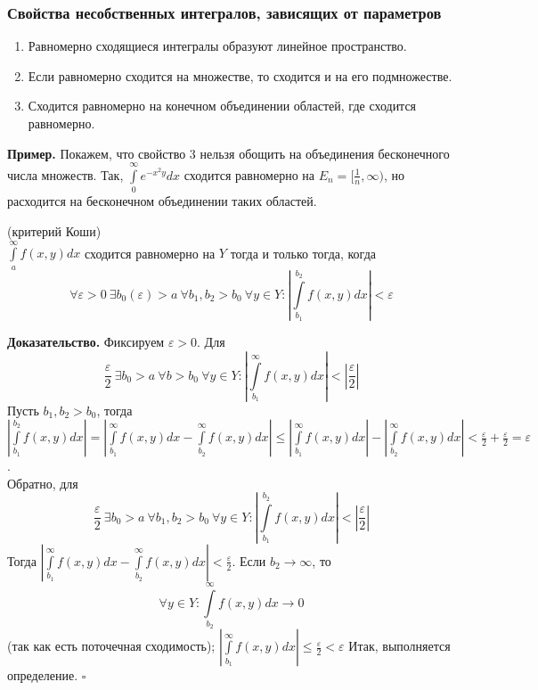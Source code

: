 \subsubsection{Свойства несобственных интегралов, зависящих от параметров}
\begin{enumerate}
    \item Равномерно сходящиеся интегралы образуют линейное пространство.
    \item Если равномерно сходится на множестве, то сходится и на его 
        подмножестве.
    \item Сходится равномерно на конечном объединении областей, 
        где сходится равномерно.
\end{enumerate}
\textbf{Пример.} Покажем, что свойство 3 нельзя обощить на объединения
бесконечного числа множеств. Так, $\int\limits_{0}^{\infty}e^{-x^2y}dx$
сходится равномерно на $E_n=[\frac{1}{n},\infty)$, но расходится на 
бесконечном объединении таких областей. 
\begin{theor}(критерий Коши)\\
    $\int\limits_{a}^{\infty}f(x,y)dx$ сходится равномерно на $Y$ тогда и 
    только тогда, когда 
     $$\forall \varepsilon>0~\exists b_0(\varepsilon)>a~\forall b_1,b_2>b_0~
 \forall y\in Y:\left|\int\limits_{b_1}^{b_2}f(x,y)dx\right|<\varepsilon$$
\end{theor}
\textbf{Доказательство.}  Фиксируем $\varepsilon>0$. Для 
$$\frac{\varepsilon}{2}~\exists b_0>a~\forall b>b_0~\forall y\in Y:
\left|\int\limits_{b_1}^{\infty}f(x,y)dx\right|<
\left|\frac{\varepsilon}{2}\right|$$
Пусть $b_1,b_2>b_0$, тогда $\left| \int\limits_{b_1}^{b_2}f(x,y)dx\right|=
\left|\int\limits_{b_1}^{\infty}f(x,y)dx-\int\limits_{b_2}^{\infty} f(x,y)dx
\right|\leqslant 
\left|\int\limits_{b_1}^{\infty}f(x,y)dx\right|
-\left|\int\limits_{b_2}^{\infty} f(x,y)dx\right|<
\frac{\varepsilon}{2}+\frac{\varepsilon}{2}=\varepsilon$.\\
Обратно, для
$$\frac{\varepsilon}{2}~\exists b_0>a~\forall b_1,b_2>b_0~\forall y\in Y:
\left|\int\limits_{b_1}^{b_2}f(x,y)dx\right|<
\left|\frac{\varepsilon}{2}\right|$$
Тогда 
$\left|\int\limits_{b_1}^{\infty}f(x,y)dx-\int\limits_{b_2}^{\infty} f(x,y)dx
\right|<\frac{\varepsilon}{2}$. Если $b_2\to \infty$, то
$$\forall y\in Y: \int\limits_{b_2}^{\infty}f(x,y)dx\to 0$$ 
(так как есть поточечная сходимость);
$\left|\int\limits_{b_1}^{\infty}f(x,y)dx\right|\leqslant\frac{\varepsilon}{2}
<\varepsilon$
Итак, выполняется определение. $\square$ \\

